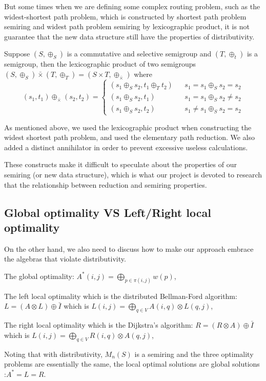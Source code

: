 \documentclass[a4paper,12pt,twoside,openright]{report}
\begin{document}
But some times when we are defining some complex routing problem, such as the widest-shortest path problem, which is constructed by shortest path problem semiring and widest path problem semiring by lexicographic product, it is not guarantee that the new data structure still have the properties of distributivity.

Suppose $(S,\oplus_S)$ is a commutative and selective semigroup and $(T,\oplus_t)$ is a semigroup, then the lexicographic product of two semigroups $(S,\oplus_S) \bar{\times} (T,\oplus_T) = (S\times T, \oplus_{\bar{\times}})$ where
\[(s_1,t_1) \oplus_{\bar{\times}} (s_2,t_2)=\left\{
\begin{array}{rcl}
(s_1\oplus_S s_2,t_1\oplus_T t_2)      &      & { s_1 = s_1 \oplus_S s_2 = s_2}\\
(s_1\oplus_S s_2,t_1)       &      & {s_1 = s_1 \oplus_S s_2 \neq s_2}\\
(s_1\oplus_S s_2,t_2)       &      & {s_1 \neq s_1 \oplus_S s_2 = s_2}
\end{array} \right.\]

As mentioned above, we used the lexicographic product when constructing the widest shortest path problem, and used the elementary path reduction. We also added a distinct annihilator in order to prevent excessive useless calculations. 

These constructs make it difficult to speculate about the properties of our semiring (or new data structure), which is what our project is devoted to research that the relationship between reduction and semiring properties.

\subsection{Global optimality VS Left/Right local optimality}
On the other hand, we also need to discuss how to make our approach embrace the algebras that violate distributivity.

The global optimality: $A^*(i,j) = \bigoplus_{p \in \pi (i,j)}w(p)$,

The left local optimality which is the distributed Bellman-Ford algorithm: $L = (A\otimes L) \oplus \bar{I}$ which is  $L(i,j) = \bigoplus_{q \in V} A(i,q)\otimes L(q,j)$,

The right local optimality which is the Dijkstra's algorithm: $R = (R\otimes A) \oplus \bar{I}$ which is  $L(i,j) = \bigoplus_{q \in V} R(i,q)\otimes A(q,j)$,

Noting that with distributivity, $M_n(S)$ is a semiring and the three optimality problems are essentially the same, the local optimal solutions are global solutions :$A^* = L = R$.
\end{document}
